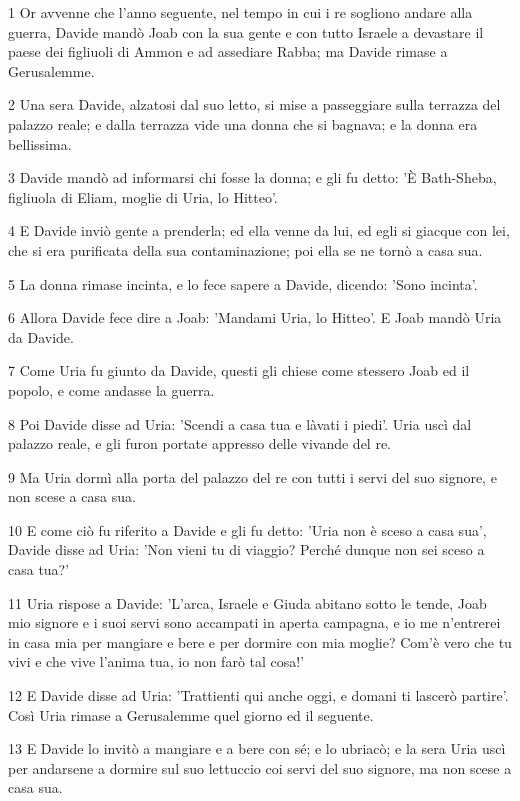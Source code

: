 \par 1 Or avvenne che l'anno seguente, nel tempo in cui i re sogliono andare alla guerra, Davide mandò Joab con la sua gente e con tutto Israele a devastare il paese dei figliuoli di Ammon e ad assediare Rabba; ma Davide rimase a Gerusalemme.
\par 2 Una sera Davide, alzatosi dal suo letto, si mise a passeggiare sulla terrazza del palazzo reale; e dalla terrazza vide una donna che si bagnava; e la donna era bellissima.
\par 3 Davide mandò ad informarsi chi fosse la donna; e gli fu detto: 'È Bath-Sheba, figliuola di Eliam, moglie di Uria, lo Hitteo'.
\par 4 E Davide inviò gente a prenderla; ed ella venne da lui, ed egli si giacque con lei, che si era purificata della sua contaminazione; poi ella se ne tornò a casa sua.
\par 5 La donna rimase incinta, e lo fece sapere a Davide, dicendo: 'Sono incinta'.
\par 6 Allora Davide fece dire a Joab: 'Mandami Uria, lo Hitteo'. E Joab mandò Uria da Davide.
\par 7 Come Uria fu giunto da Davide, questi gli chiese come stessero Joab ed il popolo, e come andasse la guerra.
\par 8 Poi Davide disse ad Uria: 'Scendi a casa tua e làvati i piedi'. Uria uscì dal palazzo reale, e gli furon portate appresso delle vivande del re.
\par 9 Ma Uria dormì alla porta del palazzo del re con tutti i servi del suo signore, e non scese a casa sua.
\par 10 E come ciò fu riferito a Davide e gli fu detto: 'Uria non è sceso a casa sua', Davide disse ad Uria: 'Non vieni tu di viaggio? Perché dunque non sei sceso a casa tua?'
\par 11 Uria rispose a Davide: 'L'arca, Israele e Giuda abitano sotto le tende, Joab mio signore e i suoi servi sono accampati in aperta campagna, e io me n'entrerei in casa mia per mangiare e bere e per dormire con mia moglie? Com'è vero che tu vivi e che vive l'anima tua, io non farò tal cosa!'
\par 12 E Davide disse ad Uria: 'Trattienti qui anche oggi, e domani ti lascerò partire'. Così Uria rimase a Gerusalemme quel giorno ed il seguente.
\par 13 E Davide lo invitò a mangiare e a bere con sé; e lo ubriacò; e la sera Uria uscì per andarsene a dormire sul suo lettuccio coi servi del suo signore, ma non scese a casa sua.
